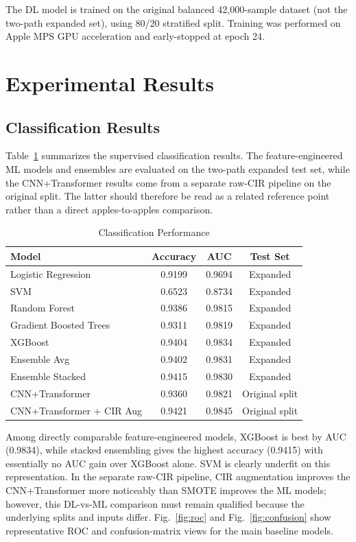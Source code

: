 \documentclass[conference]{IEEEtran}
\begin{document}
The DL model is trained on the original balanced 42,000-sample dataset (not the two-path expanded set), using 80/20 stratified split. Training was performed on Apple MPS GPU acceleration and early-stopped at epoch 24.

\section{Experimental Results}

\subsection{Classification Results}

Table~\ref{tab:cls_results} summarizes the supervised classification results. The feature-engineered ML models and ensembles are evaluated on the two-path expanded test set, while the CNN+Transformer results come from a separate raw-CIR pipeline on the original split. The latter should therefore be read as a related reference point rather than a direct apples-to-apples comparison.

\begin{table}[t]
\caption{Classification Performance}
\label{tab:cls_results}
\centering
\begin{tabular}{@{}lccc@{}}
\toprule
\textbf{Model} & \textbf{Accuracy} & \textbf{AUC} & \textbf{Test Set} \\
\midrule
Logistic Regression & 0.9199 & 0.9694 & Expanded \\
SVM & 0.6523 & 0.8734 & Expanded \\
Random Forest & 0.9386 & 0.9815 & Expanded \\
Gradient Boosted Trees & 0.9311 & 0.9819 & Expanded \\
XGBoost & 0.9404 & 0.9834 & Expanded \\
Ensemble Avg & 0.9402 & 0.9831 & Expanded \\
Ensemble Stacked & 0.9415 & 0.9830 & Expanded \\
CNN+Transformer & 0.9360 & 0.9821 & Original split \\
CNN+Transformer + CIR Aug & 0.9421 & 0.9845 & Original split \\
\bottomrule
\end{tabular}
\end{table}

Among directly comparable feature-engineered models, XGBoost is best by AUC (0.9834), while stacked ensembling gives the highest accuracy (0.9415) with essentially no AUC gain over XGBoost alone. SVM is clearly underfit on this representation. In the separate raw-CIR pipeline, CIR augmentation improves the CNN+Transformer more noticeably than SMOTE improves the ML models; however, this DL-vs-ML comparison must remain qualified because the underlying splits and inputs differ. Fig.~\ref{fig:roc} and Fig.~\ref{fig:confusion} show representative ROC and confusion-matrix views for the main baseline models.
\end{document}
